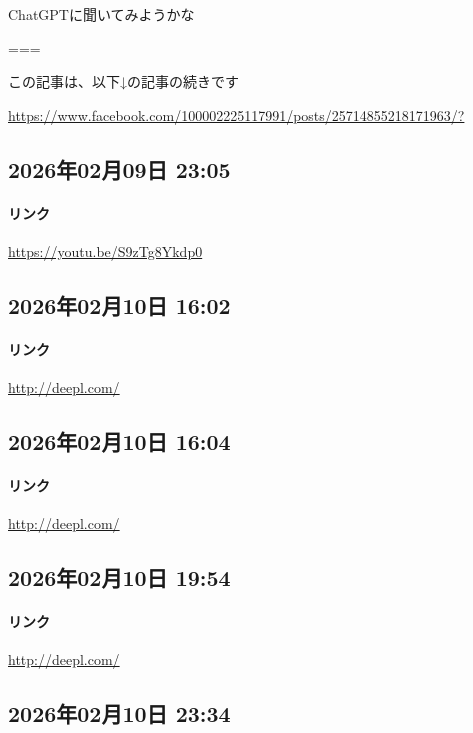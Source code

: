 ChatGPTに聞いてみようかな

===

この記事は、以下↓の記事の続きです

\url{https://www.facebook.com/100002225117991/posts/25714855218171963/?}

\subsection*{2026年02月09日 23:05}

\paragraph{リンク}
\url{https://youtu.be/S9zTg8Ykdp0}

\subsection*{2026年02月10日 16:02}

\paragraph{リンク}
\url{http://deepl.com/}

\subsection*{2026年02月10日 16:04}

\paragraph{リンク}
\url{http://deepl.com/}

\subsection*{2026年02月10日 19:54}

\paragraph{リンク}
\url{http://deepl.com/}

\subsection*{2026年02月10日 23:34}

